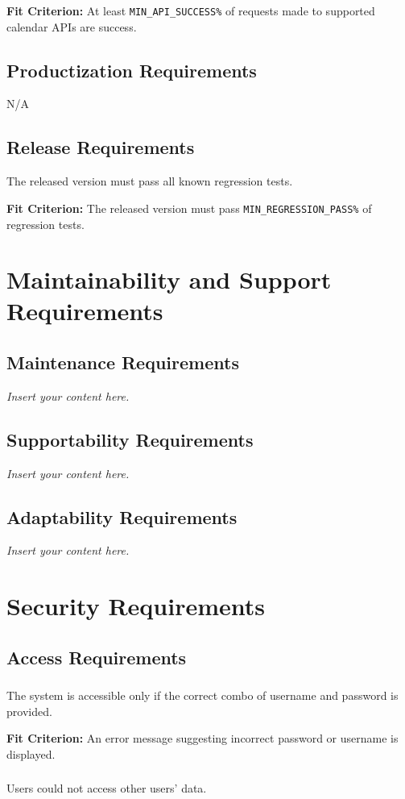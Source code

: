 \documentclass[12pt]{article}
\newcommand{\lips}{\textit{Insert your content here.}}
\begin{document}
\textbf{Fit Criterion:} At least \texttt{MIN\_API\_SUCCESS\%} of requests made to supported calendar APIs are success.
\subsection{Productization Requirements}
N/A
\subsection{Release Requirements}
The released version must pass all known regression tests.

\textbf{Fit Criterion:} The released version must pass \texttt{MIN\_REGRESSION\_PASS\%} of regression tests. 

\section{Maintainability and Support Requirements}
\subsection{Maintenance Requirements}
\lips
\subsection{Supportability Requirements}
\lips
\subsection{Adaptability Requirements}
\lips

\section{Security Requirements}
\subsection{Access Requirements}
\subsubsection{}
The system is accessible only if the correct combo of username and password is provided.

\textbf{Fit Criterion:} An error message suggesting incorrect password or username is displayed.
\subsubsection{}
Users could not access other users' data.
\end{document}
